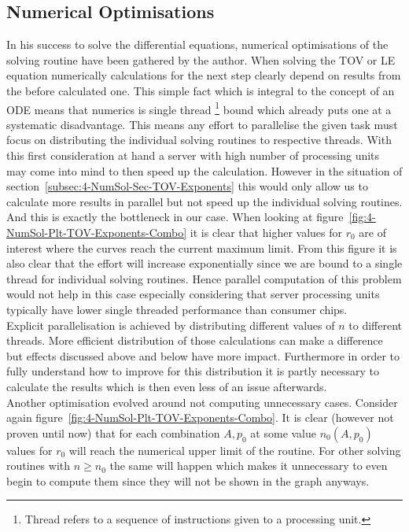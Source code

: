 \subsection{Numerical Optimisations}
\label{subsec:99-App-Numerical-Optimisations}
In his success to solve the differential equations, numerical optimisations of the solving routine have been gathered by the author.
When solving the \ac{TOV} or \ac{LE} equation numerically calculations for the next step clearly depend on results from the before calculated one.
This simple fact which is integral to the concept of an \ac{ODE} means that numerics is single thread \footnote{Thread refers to a sequence of instructions given to a processing unit.} bound which already puts one at a systematic disadvantage.
This means any effort to parallelise the given task must focus on distributing the individual solving routines to respective threads.
With this first consideration at hand a server with high number of processing units may come into mind to then speed up the calculation.
However in the situation of section~\ref{subsec:4-NumSol-Sec-TOV-Exponents} this would only allow us to calculate more results in parallel but not speed up the individual solving routines.
And this is exactly the bottleneck in our case.
When looking at figure~\ref{fig:4-NumSol-Plt-TOV-Exponents-Combo} it is clear that higher values for $r_0$ are of interest where the curves reach the current maximum limit.
From this figure it is also clear that the effort will increase exponentially since we are bound to a single thread for individual solving routines.
Hence parallel computation of this problem would not help in this case especially considering that server processing units typically have lower single threaded performance than consumer chips.\\
Explicit parallelisation is achieved by distributing different values of $n$ to different threads.
More efficient distribution of those calculations can make a difference but effects discussed above and below have more impact.
Furthermore in order to fully understand how to improve for this distribution it is partly necessary to calculate the results which is then even less of an issue afterwards.\\
Another optimisation evolved around not computing unnecessary cases.
Consider again figure~\ref{fig:4-NumSol-Plt-TOV-Exponents-Combo}.
It is clear (however not proven until now) that for each combination $A,p_0$ at some value $n_0(A,p_0)$ values for $r_0$ will reach the numerical upper limit of the routine.
For other solving routines with $n\geq n_0$ the same will happen which makes it unnecessary to even begin to compute them since they will not be shown in the graph anyways.
